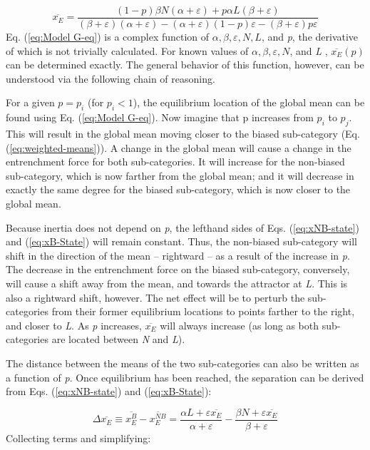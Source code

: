 \begin{equation}
\overline{x_{E}}=\frac{(1-p)\beta N(\alpha+\varepsilon)+p\alpha L(\beta+\varepsilon)}{(\beta+\varepsilon)(\alpha+\varepsilon)-(\alpha+\varepsilon)(1-p)\varepsilon-(\beta+\varepsilon)p\varepsilon}\label{eq:Model G-eq}
\end{equation}
Eq. (\ref{eq:Model G-eq}) is a complex function of $\alpha,\beta,\varepsilon,N,L$,
and \emph{p}, the derivative of which is not trivially calculated.
For known values of $\alpha,\beta,\varepsilon,N$, and \emph{L} ,
$\overline{x_{E}}(p)$ can be determined exactly. The general behavior
of this function, however, can be understood via the following chain
of reasoning. 

For a given $p=p_{i}$ (for $p_{i}<1$), the equilibrium location
of the global mean can be found using Eq. (\ref{eq:Model G-eq}).
Now imagine that p increases from $p_{i}$ to $p_{j}$. This will
result in the global mean moving closer to the biased sub-category
(Eq. (\ref{eq:weighted-means})). A change in the global mean will
cause a change in the entrenchment force for both sub-categories.
It will increase for the non-biased sub-category, which is now farther
from the global mean; and it will decrease in exactly the same degree
for the biased sub-category, which is now closer to the global mean.

Because inertia does not depend on \emph{p}, the lefthand sides of
Eqs. (\ref{eq:xNB-state}) and (\ref{eq:xB-State}) will remain constant.
Thus, the non-biased sub-category will shift in the direction of the
mean – rightward – as a result of the increase in \emph{p}. The decrease
in the entrenchment force on the biased sub-category, conversely,
will cause a shift away from the mean, and towards the attractor at
\emph{L}. This is also a rightward shift, however. The net effect
will be to perturb the sub-categories from their former equilibrium
locations to points farther to the right, and closer to \emph{L}.
As \emph{p} increases, $\overline{x_{E}}$ will always increase (as
long as both sub-categories are located between \emph{N} and \emph{L}).

The distance between the means of the two sub-categories can also
be written as a function of \emph{p}. Once equilibrium has been reached,
the separation can be derived from Eqs. (\ref{eq:xNB-state}) and
(\ref{eq:xB-State}):

\begin{equation}
\Delta\overline{x_{E}}\equiv\overline{x_{E}^{B}}-\overline{x_{E}^{NB}}=\frac{\alpha L+\varepsilon\overline{x_{E}}}{\alpha+\varepsilon}-\frac{\beta N+\varepsilon\overline{x_{E}}}{\beta+\varepsilon}
\end{equation}
Collecting terms and simplifying:

